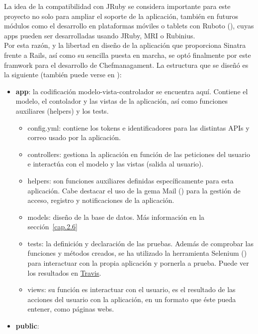 La idea de la compatibilidad con JRuby se considera importante para este proyecto no solo para ampliar el soporte de la aplicación, también en futuros módulos como el desarrollo en plataformas móviles o tablets con Ruboto (\cite{URL:Ruboto}), cuyas apps pueden ser desarrolladas usando JRuby, MRI o Rubinius. \\

Por esta razón, y la libertad en diseño de la aplicación que proporciona Sinatra frente a Rails, así como su sencilla puesta en marcha, se optó finalmente por este framwork para el desarrollo de Chefmanagament. La estructura que se diseñó es la siguiente (también puede verse en \cite{URL:GitHub}):

\begin{itemize}
	\item \textbf{app}: la codificación modelo-vista-controlador se encuentra aquí. Contiene el modelo, el contolador y las vistas de la aplicación, así como funciones auxiliares (helpers) y los tests.
		\begin{itemize}
			\item config.yml: contiene los tokens e identificadores para las distintas APIs y correo usado por la aplicación.
			\item controllers: gestiona la aplicación en función de las peticiones del usuario e interactúa con el modelo y las vistas (salida al usuario).
			\item helpers: son funciones auxiliares definidas específicamente para esta aplicación. Cabe destacar el uso de la gema Mail (\cite{URL:Gema_mail}) para la gestión de acceso, registro y notificaciones de la aplicación.
			\item models: diseño de la base de datos. Más información en la sección~\ref{cap.2.6}
			\item tests: la definición y declaración de las pruebas. Además de comprobar las funciones y métodos creados, se ha utilizado la herramienta Selenium (\cite{URL:Selenium}) para interactuar con la propia aplicación y pornerla a prueba. Puede ver los resultados en \href{https://travis-ci.org/alu0100207385/ChefManagement?branch=testing}{Travis}.
			\item views: su función es interactuar con el usuario, es el resultado de las acciones del usuario con la aplicación, en un formato que éste pueda entener, como páginas webs.
		\end{itemize}
	\item \textbf{public}:
		\begin{itemize}

\end{itemize}
\end{itemize}
